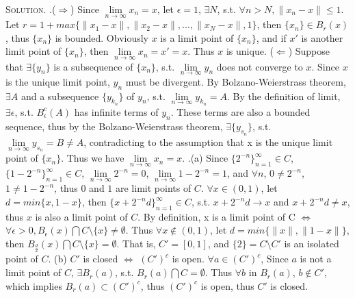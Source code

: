 \documentclass[12pt, a4paper, oneside]{ctexart}
\newenvironment{solution}{\par\noindent\textsc{Solution. }}{\\\par}
\begin{document}
\begin{solution}.($\Rightarrow$) Since $\lim\limits_{n\to\infty} x_{n} = x$, let $\epsilon = 1$, $\exists N$, s.t. $\forall n > N, \|x_{n} - x\| \leq 1$. Let $r = 1 + max\{\|x_{1} - x\|, \|x_{2} - x\|, ... , \|x_{N} - x\|, 1\}$, then $\{x_{n}\} \in B_{r}(x)$, thus $\{x_{n}\}$ is bounded. Obviously $x$ is a limit point of $\{x_{n}\}$, and if $x'$ is another limit point of $\{x_{n}\}$, then $\lim\limits_{n\to\infty} x_{n} = x' = x$. Thus $x$ is unique. \newline
	($\Leftarrow$) Suppose that $\exists \{y_{n}\}$ is a subsequence of $\{x_{n}\}$, s.t. $\lim\limits_{n\to\infty} y_{n}$ does not converge to $x$. Since $x$ is the unique limit point, $y_{n}$ must be divergent. By Bolzano-Weierstrass theorem, $\exists A$ and a subsequence $\{y_{k_{n}}\}$ of $y_{n}$, s.t. $\lim\limits_{n\to\infty} y_{k_{n}} = A$. By the definition of limit, $\exists \epsilon$, s.t. $B_{\epsilon}^{c}(A)$ has infinite terms of $y_{n}$. These terms are also a bounded sequence, thus by the Bolzano-Weierstrass theorem, $\exists \{y_{s_{n}}\}$, s.t. $\lim\limits_{n\to\infty} y_{s_{n}} = B \neq A$, contradicting to the assumption that x is the unique limit point of $\{x_{n}\}$. Thus we have $\lim\limits_{n\to\infty} x_{n} = x$. .(a) Since $\{2^{-n}\}_{n = 1}^{\infty} \in C$, $\{1-2^{-n}\}_{n = 1}^{\infty} \in C$, $\lim\limits_{n\to\infty} 2^{-n} = 0$, $\lim\limits_{n\to\infty} 1 - 2^{-n} = 1$, and $\forall n$, $0 \neq 2^{-n}$, $1 \neq 1-2^{-n}$, thus $0$ and $1$ are limit points of $C$. $\forall x \in (0,1)$, let $d = min\{x, 1-x\}$, then $\{x + 2^{-n}d\}_{n = 1}^{\infty} \in C$, s.t. $x + 2^{-n}d \to x$ and $x + 2^{-n}d \neq x$, thus $x$ is also a limit point of $C$. By definition, x is a limit point of C $\Leftrightarrow$ $\forall \epsilon > 0, B_{\epsilon}(x) \bigcap C\setminus\{x\} \neq \emptyset$. Thus $\forall x \notin (0,1)$, let $d = min\{\|x\|, \|1-x\|\}$, then $B_{\frac{d}{2}}(x) \bigcap C\setminus\{x\} = \emptyset$. That is, $C' = [0,1]$, and $\{2\} = C\setminus C'$ is an isolated point of $C$. \newline
	(b) $C'$ is closed $\Leftrightarrow$ $(C')^{c}$ is open. $\forall a \in (C')^{c}$, Since $a$ is not a limit point of $C$, $\exists B_{r}(a)$, s.t. $B_{r}(a) \bigcap C = \emptyset$. Thus $\forall b$ in $B_{r}(a)$, $b \notin C'$, which implies $B_{r}(a) \subset (C')^{c}$, thus $(C')^{c}$ is open, thus $C'$ is closed.
\end{solution}
\end{document}
